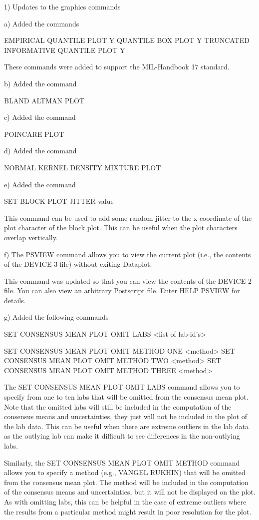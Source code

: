  1) Updates to the graphics commands

    a) Added the commands

         EMPIRICAL QUANTILE PLOT Y
         QUANTILE BOX PLOT Y
         TRUNCATED INFORMATIVE QUANTILE PLOT Y

       These commands were added to support the MIL-Handbook 17 standard.

    b) Added the command

         BLAND ALTMAN PLOT

    c) Added the command

         POINCARE PLOT

    d) Added the command

         NORMAL KERNEL DENSITY MIXTURE PLOT

    e) Added the command

          SET BLOCK PLOT JITTER  value

       This command can be used to add some random jitter to the
       x-coordinate of the plot character of the block plot.  This can
       be useful when the plot characters overlap vertically.

    f) The PSVIEW command allows you to view the current plot (i.e.,
       the contents of the DEVICE 3 file) without exiting Dataplot.

       This command was updated so that you can view the contents of
       the DEVICE 2 file.  You can also view an arbitrary Postscript
       file.  Enter HELP PSVIEW for details.

    g) Added the following commands

          SET CONSENSUS MEAN PLOT OMIT LABS <list of lab-id's>

          SET CONSENSUS MEAN PLOT OMIT METHOD ONE   <method>
          SET CONSENSUS MEAN PLOT OMIT METHOD TWO   <method>
          SET CONSENSUS MEAN PLOT OMIT METHOD THREE <method>

       The SET CONSENSUS MEAN PLOT OMIT LABS command allows you to
       specify from one to ten labs that will be omitted from the
       consensus mean plot.  Note that the omitted labs will still be
       included in the computation of the consensus means and
       uncertainties, they just will not be included in the plot of the
       lab data.  This can be useful when there are extreme outliers in
       the lab data as the outlying lab can make it difficult to see
       differences in the non-outlying labs.

       Similarly, the SET CONSENSUS MEAN PLOT OMIT METHOD command
       allows you to specify a method (e.g., VANGEL RUKHIN) that
       will be omitted from the consensus mean plot.  The method will
       be included in the computation of the consensus means and
       uncertainties, but it will not be displayed on the plot.  As
       with omitting labs, this can be helpful in the case of extreme
       outliers where the results from a particular method might
       result in poor resolution for the plot.

